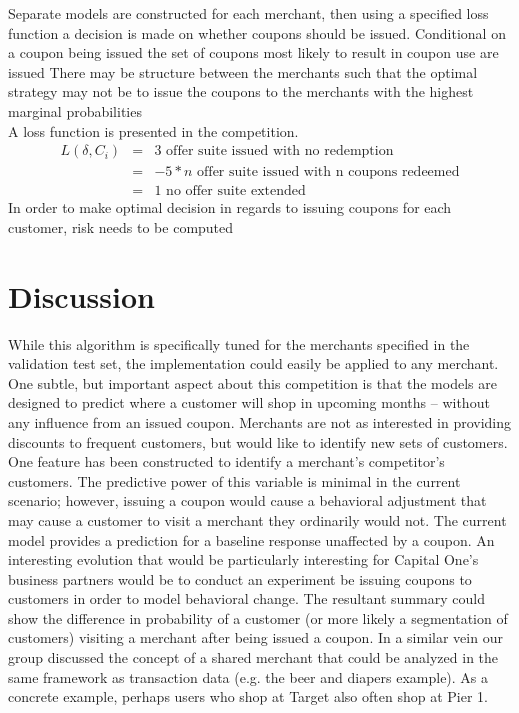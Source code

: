 \documentclass[12pt]{article} %
\begin{document}
Separate models are constructed for each merchant, then using a specified loss function a decision is made on whether coupons should be issued.  Conditional on a coupon being issued the set of coupons most likely to result in coupon use are issued \ac{There may be structure between the merchants such that the optimal strategy may not be to issue the coupons to the merchants with the highest marginal probabilities} \\

A loss function is presented in the competition.  
\begin{eqnarray*}
L(\delta,C_i) &=& 3 \text {  offer suite issued with no redemption}\\
&=& -5 * n \text{  offer suite issued with n coupons redeemed}\\
&=& 1 \text{  no offer suite extended}
\end{eqnarray*}
In order to make optimal decision in regards to issuing coupons for each customer, risk needs to be computed


\section{Discussion}
While this algorithm is specifically tuned for the merchants specified in the validation test set, the implementation could easily be applied to any merchant.  One subtle, but important aspect about this competition is that the models are designed to predict where a customer will shop in upcoming months -- without any influence from an issued coupon.  Merchants are not as interested in providing discounts to frequent customers, but would like to identify new sets of customers.  One feature has been constructed to identify a merchant's competitor's customers.  The predictive power of this variable is minimal in the current scenario; however, issuing a coupon would cause a behavioral adjustment that may cause a customer to visit a merchant they ordinarily would not.  The current model provides a prediction for a baseline response unaffected by a coupon.  An interesting evolution that would be particularly interesting for Capital One's business partners would be to conduct an experiment be issuing coupons to customers in order to model behavioral change.    The resultant summary could show the difference in probability of a customer (or more likely a segmentation of customers)  visiting a merchant after being issued a coupon.  In a similar vein our group discussed the concept of a shared merchant that could be analyzed in the same framework as transaction data (e.g. the beer and diapers example).  As a concrete example, perhaps users who shop at Target also often shop at Pier 1.
\end{document}
